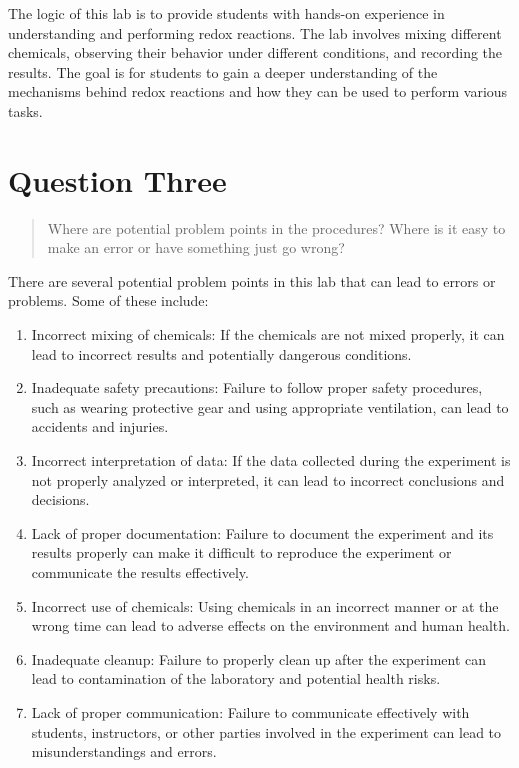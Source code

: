 \documentclass[11pt, letterpaper]{article}
\begin{document}
The logic of this lab is to provide students with hands-on experience in understanding 
and performing redox reactions.
The lab involves mixing different chemicals, observing their behavior under different conditions, 
and recording the results.
The goal is for students to gain a deeper understanding of 
the mechanisms behind redox reactions and how they can be used to perform various tasks.




\section{Question Three}
\begin{quote}
    Where are potential problem points in the procedures? Where is it easy to make an error 
    or have something just go wrong?
\end{quote}

There are several potential problem points in this lab that can lead to errors or problems. Some of 
these include:
\begin{enumerate}
    \item Incorrect mixing of chemicals: If the chemicals are not mixed properly,
        it can lead to incorrect results and potentially dangerous conditions.
    \item  Inadequate safety precautions: Failure to follow proper safety procedures,
        such as wearing protective gear and using appropriate ventilation,
        can lead to accidents and injuries.
    \item Incorrect interpretation of data: If the data collected during the experiment
        is not properly analyzed or interpreted,
        it can lead to incorrect conclusions and decisions.
    \item Lack of proper documentation: Failure to document the experiment and its results
        properly can make it difficult to reproduce the experiment or communicate
        the results effectively.
    \item Incorrect use of chemicals: Using chemicals in an incorrect manner or at the
        wrong time can lead to adverse effects on the environment and human health.
    \item Inadequate cleanup: Failure to properly clean up after the experiment
        can lead to contamination of the laboratory and potential health risks.
    \item Lack of proper communication: Failure to communicate effectively with
        students, instructors, or other parties involved in the experiment
        can lead to misunderstandings and errors.
\end{enumerate}
\end{document}
